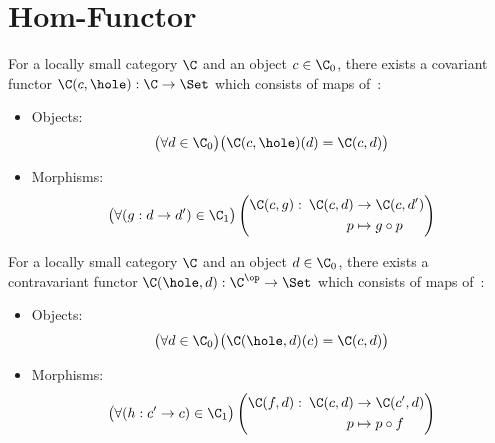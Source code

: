 \section{Hom-Functor}

\begin{definition}
  For a locally small category $\C$ and an object $c\in \C_0$, there exists a
  covariant functor $\C(c, \hole) : \C \to \Set$ which consists of maps
  of~\parencite[p.~84]{leinster:basic_category_theory}:
  \begin{itemize}
    \item Objects:
      \[\big(\forall d \in \C_0\big)
        \big(\C(c, \hole)(d) = \C(c, d)\big)\]
    \item Morphisms:
      \[
        \begin{gathered}
          \big(\forall (g: d\to d')\in \C_1\big)
          \left(
            \begin{aligned}
              \C(c, g):&&\!\!\! \C(c, d) &\to \C(c, d')\\
              &&p &\mapsto g\circ p
            \end{aligned}
          \right)
        \end{gathered}
      \]
  \end{itemize}
\end{definition}

\begin{definition}
  For a locally small category $\C$ and an object $d\in \C_0$, there exists a
  contravariant functor $\C(\hole, d) : \C^\op \to \Set$ which consists
  of maps of~\parencite[p.~90]{leinster:basic_category_theory}:
  \begin{itemize}
    \item Objects:
      \[\big(\forall d \in \C_0\big)
        \big(\C(\hole, d)(c) = \C(c, d)\big)\]
    \item Morphisms:
      \[
        \begin{gathered}
          \big(\forall (h: c'\to c)\in \C_1\big)
          \left(
            \begin{aligned}
              \C(f, d):&&\!\!\! \C(c, d) &\to \C(c', d)\\
              &&p &\mapsto p\circ f
            \end{aligned}
          \right)
        \end{gathered}
      \]
  \end{itemize}
\end{definition}

